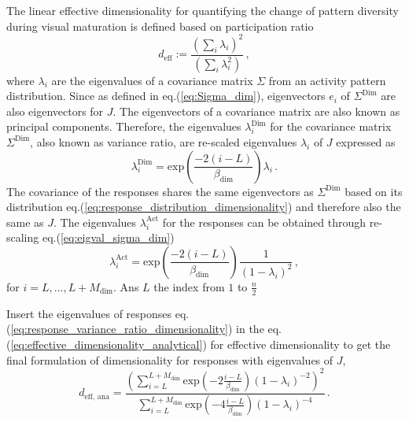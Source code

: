 \documentclass[11pt]{article}
\begin{document}
	The linear effective dimensionality
	for quantifying the change of pattern diversity during visual maturation is defined based on participation ratio 
		\begin{equation} \label{eq:effective_dimensionality_analytical}
			d_{\text{eff}} := \frac{\left(\sum_{i} \lambda_i\right)^2}{\left( \sum_{i} \lambda_i^2\right)} \, ,
		\end{equation}
	where $\lambda_i$ are the eigenvalues of a covariance matrix $\Sigma$ from an activity pattern distribution. Since as defined in eq.(\ref{eq:Sigma_dim}), eigenvectors $e_i$ of $\Sigma^{\text{Dim}}$ are also eigenvectors for $J$. The eigenvectors of a covariance matrix are also known as principal components. Therefore, the eigenvalues $\lambda_i^{\text{Dim}}$ for the covariance matrix $\Sigma^{\text{Dim}}$, also known as variance ratio, are re-scaled eigenvalues $\lambda_i$ of $J$ expressed as
		\begin{equation} \label{eq:eigval_sigma_dim}
			\lambda_i^{\text{Dim}} = \text{exp}\left(\frac{-2(i-L)}{\beta_{\text{dim}}}\right) \lambda_i \, .
		\end{equation}
	The covariance of the responses shares the same eigenvectors as $\Sigma^{\text{Dim}}$ based on its distribution eq.(\ref{eq:response_distribution_dimensionality}) and therefore also the same as $J$. The eigenvalues $\lambda_i^{\text{Act}}$ for the responses can be obtained through re-scaling eq.(\ref{eq:eigval_sigma_dim}) 
		\begin{equation} \label{eq:response_variance_ratio_dimensionality}
			\lambda_i^{\text{Act}} = \text{exp}\left(\frac{-2(i-L)}{\beta_{\text{dim}}}\right) \frac{1}{(1-\lambda_i)^2} \, ,
		\end{equation}
	for $i = L, ..., L+M_{\text{dim}}$. Ans $L$ the index from $1$ to $\frac{n}{2}$ %
	
	Insert the eigenvalues of responses eq.(\ref{eq:response_variance_ratio_dimensionality}) in the eq.(\ref{eq:effective_dimensionality_analytical}) for effective dimensionality to get the final formulation of dimensionality for responses with eigenvalues of $J$, 
		\begin{equation} \label{eq:dim_analytical_sym}
			d_{\text{eff, ana}} = \frac{\left(\sum_{i = L}^{L + M_{\text{dim}}} \text{exp}\left(-2 \frac{i-L}{\beta_{\text{dim}}}\right)(1-\lambda_i)^{-2}\right)^2}{\sum_{i=L}^{L+M_{\text{dim}}} \text{exp}\left(-4 \frac{i-L}{\beta_{\text{dim}}}\right)(1-\lambda_i)^{-4}} \, .
		\end{equation}
	
\end{document}
